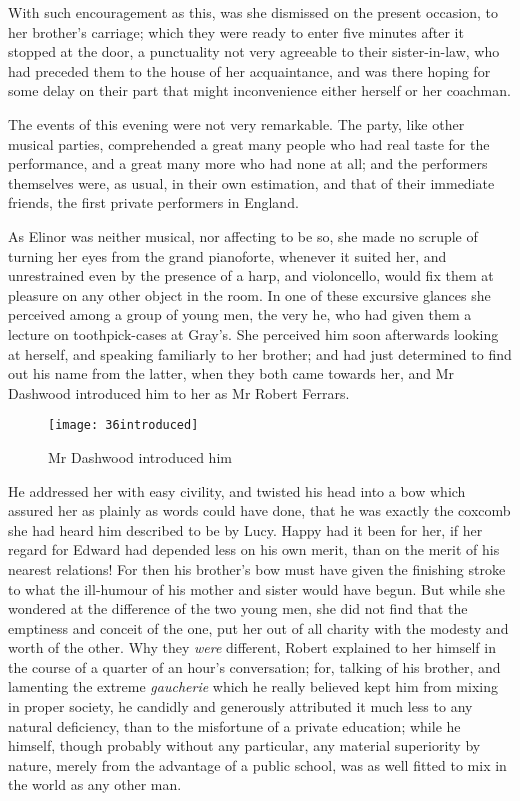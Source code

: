 With such encouragement as this, was she dismissed on the present occasion, to her brother's carriage; which they were ready to enter five minutes after it stopped at the door, a punctuality not very agreeable to their sister-in-law, who had preceded them to the house of her acquaintance, and was there hoping for some delay on their part that might inconvenience either herself or her coachman.

The events of this evening were not very remarkable. The party, like other musical parties, comprehended a great many people who had real taste for the performance, and a great many more who had none at all; and the performers themselves were, as usual, in their own estimation, and that of their immediate friends, the first private performers in England.

As Elinor was neither musical, nor affecting to be so, she made no scruple of turning her eyes from the grand pianoforte, whenever it suited her, and unrestrained even by the presence of a harp, and violoncello, would fix them at pleasure on any other object in the room. In one of these excursive glances she perceived among a group of young men, the very he, who had given them a lecture on toothpick-cases at Gray's. She perceived him soon afterwards looking at herself, and speaking familiarly to her brother; and had just determined to find out his name from the latter, when they both came towards her, and Mr Dashwood introduced him to her as Mr Robert Ferrars.

\begin{figure}[tbph]
\centering
\texttt{[image: 36introduced]}
\caption{Mr Dashwood introduced him}
\end{figure}

He addressed her with easy civility, and twisted his head into a bow which assured her as plainly as words could have done, that he was exactly the coxcomb she had heard him described to be by Lucy. Happy had it been for her, if her regard for Edward had depended less on his own merit, than on the merit of his nearest relations! For then his brother's bow must have given the finishing stroke to what the ill-humour of his mother and sister would have begun. But while she wondered at the difference of the two young men, she did not find that the emptiness and conceit of the one, put her out of all charity with the modesty and worth of the other. Why they \textit{were} different, Robert explained to her himself in the course of a quarter of an hour's conversation; for, talking of his brother, and lamenting the extreme \textit{gaucherie} which he really believed kept him from mixing in proper society, he candidly and generously attributed it much less to any natural deficiency, than to the misfortune of a private education; while he himself, though probably without any particular, any material superiority by nature, merely from the advantage of a public school, was as well fitted to mix in the world as any other man.

